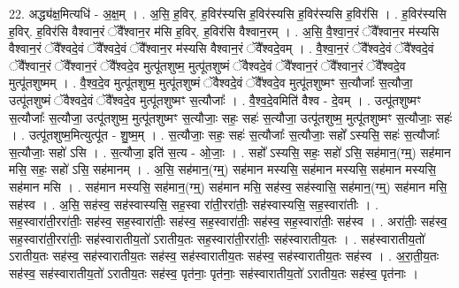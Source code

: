 \documentclass[17pt]{extarticle}
\begin{document}
22. अद्ध्य॑क्ष॒मित्यधि॑ - अ॒क्ष॒म् । . अ॒सि॒ ह॒विर्. ह॒विर॑स्यसि ह॒विर॑स्यसि ह॒विर॑स्यसि ह॒विर॑सि । . ह॒विर॑स्यसि ह॒विर्. ह॒विर॑सि वैश्वान॒रं ॅवै᳚श्वान॒र म॑सि ह॒विर्. ह॒विर॑सि वैश्वान॒रम् । . अ॒सि॒ वै॒श्वा॒न॒रं ॅवै᳚श्वान॒र म॑स्यसि वैश्वान॒रं ॅवै᳚श्वदे॒वं ॅवै᳚श्वदे॒वं ॅवै᳚श्वान॒र म॑स्यसि वैश्वान॒रं ॅवै᳚श्वदे॒वम् । . वै॒श्वा॒न॒रं ॅवै᳚श्वदे॒वं ॅवै᳚श्वदे॒वं ॅवै᳚श्वान॒रं ॅवै᳚श्वान॒रं ॅवै᳚श्वदे॒व मुत्पू॑तशुष्म॒ मुत्पू॑तशुष्मं ॅवैश्वदे॒वं ॅवै᳚श्वान॒रं ॅवै᳚श्वान॒रं ॅवै᳚श्वदे॒व मुत्पू॑तशुष्मम् । . वै॒श्व॒दे॒व मुत्पू॑तशुष्म॒ मुत्पू॑तशुष्मं ॅवैश्वदे॒वं ॅवै᳚श्वदे॒व मुत्पू॑तशुष्मꣳ स॒त्यौजाः᳚ स॒त्यौजा॒ उत्पू॑तशुष्मं ॅवैश्वदे॒वं ॅवै᳚श्वदे॒व मुत्पू॑तशुष्मꣳ स॒त्यौजाः᳚ । . वै॒श्व॒दे॒वमिति॑ वैश्व - दे॒वम् । . उत्पू॑तशुष्मꣳ स॒त्यौजाः᳚ स॒त्यौजा॒ उत्पू॑तशुष्म॒ मुत्पू॑तशुष्मꣳ स॒त्यौजाः॒ सहः॒ सहः॑ स॒त्यौजा॒ उत्पू॑तशुष्म॒ मुत्पू॑तशुष्मꣳ स॒त्यौजाः॒ सहः॑ । . उत्पू॑तशुष्म॒मित्युत्पू॑त - शु॒ष्म॒म् । . स॒त्यौजाः॒ सहः॒ सहः॑ स॒त्यौजाः᳚ स॒त्यौजाः॒ सहो᳚ ऽस्यसि॒ सहः॑ स॒त्यौजाः᳚ स॒त्यौजाः॒ सहो॑ ऽसि । . स॒त्यौजा॒ इति॑ स॒त्य - ओ॒जाः॒ । . सहो᳚ ऽस्यसि॒ सहः॒ सहो॑ ऽसि॒ सह॑मान॒(ग्म्॒) सह॑मान मसि॒ सहः॒ सहो॑ ऽसि॒ सह॑मानम् । . अ॒सि॒ सह॑मान॒(ग्म्॒) सह॑मान मस्यसि॒ सह॑मान मस्यसि॒ सह॑मान मस्यसि॒ सह॑मान मसि । . सह॑मान मस्यसि॒ सह॑मान॒(ग्म्॒) सह॑मान मसि॒ सह॑स्व॒ सह॑स्वासि॒ सह॑मान॒(ग्म्॒) सह॑मान मसि॒ सह॑स्व । . अ॒सि॒ सह॑स्व॒ सह॑स्वास्यसि॒ सह॒स्वा रा॑ती॒ररा॑तीः॒ सह॑स्वास्यसि॒ सह॒स्वारा॑तीः । . सह॒स्वारा॑ती॒ररा॑तीः॒ सह॑स्व॒ सह॒स्वारा॑तीः॒ सह॑स्व॒ सह॒स्वारा॑तीः॒ सह॑स्व॒ सह॒स्वारा॑तीः॒ सह॑स्व । . अरा॑तीः॒ सह॑स्व॒ सह॒स्वारा॑ती॒ररा॑तीः॒ सह॑स्वारातीय॒तो॑ ऽरातीय॒तः सह॒स्वारा॑ती॒ररा॑तीः॒ सह॑स्वारातीय॒तः । . सह॑स्वारातीय॒तो॑ ऽरातीय॒तः सह॑स्व॒ सह॑स्वारातीय॒तः सह॑स्व॒ सह॑स्वारातीय॒तः सह॑स्व॒ सह॑स्वारातीय॒तः सह॑स्व । . अ॒रा॒ती॒य॒तः सह॑स्व॒ सह॑स्वारातीय॒तो॑ ऽरातीय॒तः सह॑स्व॒ पृत॑नाः॒ पृत॑नाः॒ सह॑स्वारातीय॒तो॑ ऽरातीय॒तः सह॑स्व॒ पृत॑नाः । \newline
\end{document}
